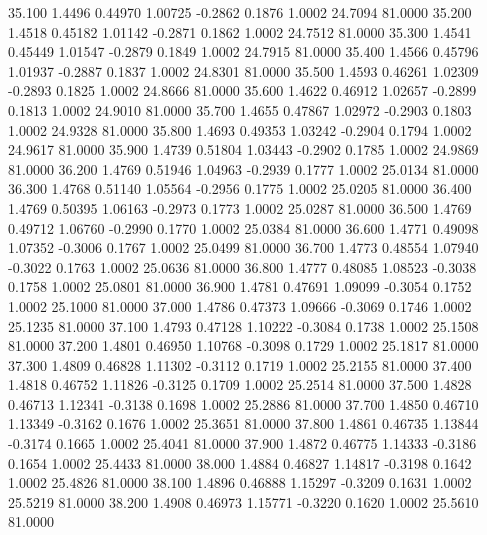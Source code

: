   35.100   1.4496   0.44970   1.00725  -0.2862   0.1876   1.0002  24.7094  81.0000
  35.200   1.4518   0.45182   1.01142  -0.2871   0.1862   1.0002  24.7512  81.0000
  35.300   1.4541   0.45449   1.01547  -0.2879   0.1849   1.0002  24.7915  81.0000
  35.400   1.4566   0.45796   1.01937  -0.2887   0.1837   1.0002  24.8301  81.0000
  35.500   1.4593   0.46261   1.02309  -0.2893   0.1825   1.0002  24.8666  81.0000
  35.600   1.4622   0.46912   1.02657  -0.2899   0.1813   1.0002  24.9010  81.0000
  35.700   1.4655   0.47867   1.02972  -0.2903   0.1803   1.0002  24.9328  81.0000
  35.800   1.4693   0.49353   1.03242  -0.2904   0.1794   1.0002  24.9617  81.0000
  35.900   1.4739   0.51804   1.03443  -0.2902   0.1785   1.0002  24.9869  81.0000
  36.200   1.4769   0.51946   1.04963  -0.2939   0.1777   1.0002  25.0134  81.0000
  36.300   1.4768   0.51140   1.05564  -0.2956   0.1775   1.0002  25.0205  81.0000
  36.400   1.4769   0.50395   1.06163  -0.2973   0.1773   1.0002  25.0287  81.0000
  36.500   1.4769   0.49712   1.06760  -0.2990   0.1770   1.0002  25.0384  81.0000
  36.600   1.4771   0.49098   1.07352  -0.3006   0.1767   1.0002  25.0499  81.0000
  36.700   1.4773   0.48554   1.07940  -0.3022   0.1763   1.0002  25.0636  81.0000
  36.800   1.4777   0.48085   1.08523  -0.3038   0.1758   1.0002  25.0801  81.0000
  36.900   1.4781   0.47691   1.09099  -0.3054   0.1752   1.0002  25.1000  81.0000
  37.000   1.4786   0.47373   1.09666  -0.3069   0.1746   1.0002  25.1235  81.0000
  37.100   1.4793   0.47128   1.10222  -0.3084   0.1738   1.0002  25.1508  81.0000
  37.200   1.4801   0.46950   1.10768  -0.3098   0.1729   1.0002  25.1817  81.0000
  37.300   1.4809   0.46828   1.11302  -0.3112   0.1719   1.0002  25.2155  81.0000
  37.400   1.4818   0.46752   1.11826  -0.3125   0.1709   1.0002  25.2514  81.0000
  37.500   1.4828   0.46713   1.12341  -0.3138   0.1698   1.0002  25.2886  81.0000
  37.700   1.4850   0.46710   1.13349  -0.3162   0.1676   1.0002  25.3651  81.0000
  37.800   1.4861   0.46735   1.13844  -0.3174   0.1665   1.0002  25.4041  81.0000
  37.900   1.4872   0.46775   1.14333  -0.3186   0.1654   1.0002  25.4433  81.0000
  38.000   1.4884   0.46827   1.14817  -0.3198   0.1642   1.0002  25.4826  81.0000
  38.100   1.4896   0.46888   1.15297  -0.3209   0.1631   1.0002  25.5219  81.0000
  38.200   1.4908   0.46973   1.15771  -0.3220   0.1620   1.0002  25.5610  81.0000
